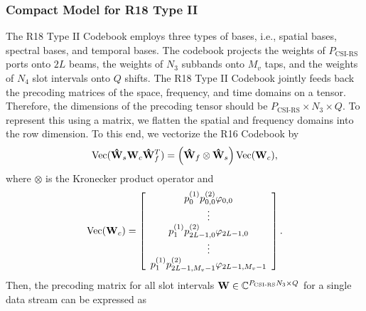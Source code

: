 \documentclass[lettersize,journal]{IEEEtran}
\begin{document}
\subsubsection{Compact Model for R18 Type II}
The R18 Type II Codebook employs three types of bases, i.e., spatial bases, spectral bases, and temporal bases. The codebook projects the weights of \( P_{\text{CSI-RS}} \) ports onto \( 2L \) beams, the weights of \( N_3 \) subbands onto \( M_v \) taps, and the weights of \( N_4 \) slot intervals onto \( Q \) shifts. The R18 Type II Codebook jointly feeds back the precoding matrices of the space, frequency, and time domains on a tensor. Therefore, the dimensions of the precoding tensor should be \( P_{\text{CSI-RS}} \times N_3 \times Q \). To represent this using a matrix, we flatten the spatial and frequency domains into the row dimension. To this end, we vectorize the R16 Codebook by
\begin{equation}
 {\rm{Vec}}({{{\bf{\hat W}}}_s}{{\bf{W}}_c}{\bf{\hat W}}_f^T) = \left( {{{{\bf{\hat W}}}_f} \otimes {{{\bf{\hat W}}}_s}} \right){\rm{Vec}}({{\bf{W}}_c}),   
\end{equation}
where  $\otimes$ is the Kronecker product operator and
\begin{equation}
{\rm{Vec}}({{\bf{W}}_c}) = \left[ {\begin{array}{*{20}{c}}
{p_0^{(1)}p_{0,0}^{(2)}{\varphi _{0,0}}}\\
 \vdots \\
{p_1^{(1)}p_{2L - 1,0}^{(2)}{\varphi _{2L - 1,0}}}\\
 \vdots \\
{p_1^{(1)}p_{2L - 1,{M_v} - 1}^{(2)}{\varphi _{2L - 1,{M_v} - 1}}}
\end{array}} \right].
\end{equation}
Then, the precoding matrix for all slot intervals \( {\bf{W}} \in \mathbb{C}^{{P_{{\text{CSI-RS}}}N_3}\times Q} \) for a single data stream can be expressed as
\end{document}
